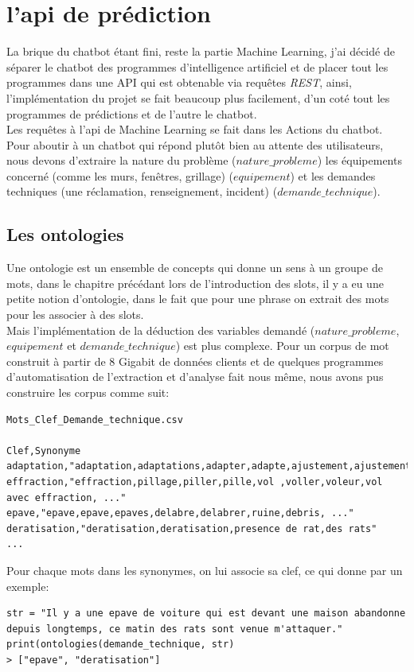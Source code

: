 \chapter{l'api de prédiction}
La brique du chatbot étant fini, reste la partie Machine Learning, j'ai décidé de séparer le chatbot des programmes d'intelligence artificiel et de placer tout les programmes dans une API qui est obtenable via requêtes \textit{REST}, ainsi, l'implémentation du projet se fait beaucoup plus facilement, d'un coté tout les programmes de prédictions et de l'autre le chatbot.\\
Les requêtes à l'api de Machine Learning se fait dans les Actions du chatbot.\\
\linebreak
Pour aboutir à un chatbot qui répond plutôt bien au attente des utilisateurs, nous devons d'extraire la nature du problème ($nature\_probleme$) les équipements concerné (comme les murs, fenêtres, grillage) ($equipement$) et les demandes techniques (une réclamation, renseignement, incident) ($demande\_technique$).

\pagebreak
\section{Les ontologies}
Une ontologie est un ensemble de concepts qui donne un sens à un groupe de mots, dans le chapitre précédant lors de l'introduction des slots, il y a eu une petite notion d'ontologie, dans le fait que pour une phrase on extrait des mots pour les associer à des slots.\\
Mais l'implémentation de la déduction des variables demandé ($nature\_probleme$, $equipement$ et $demande\_technique$) est plus complexe. Pour un corpus de mot construit à partir de 8 Gigabit de données clients et de quelques programmes d'automatisation de l'extraction et d'analyse fait nous même, nous avons pus construire les corpus comme suit:

\begin{lstlisting}
Mots_Clef_Demande_technique.csv

Clef,Synonyme
adaptation,"adaptation,adaptations,adapter,adapte,ajustement,ajustements,ajuster,..."
effraction,"effraction,pillage,piller,pille,vol ,voller,voleur,vol avec effraction, ..."
epave,"epave,epave,epaves,delabre,delabrer,ruine,debris, ..."
deratisation,"deratisation,deratisation,presence de rat,des rats"
...
\end{lstlisting}

Pour chaque mots dans les synonymes, on lui associe sa clef, ce qui donne par un exemple:
\begin{lstlisting}
str = "Il y a une epave de voiture qui est devant une maison abandonne depuis longtemps, ce matin des rats sont venue m'attaquer."
print(ontologies(demande_technique, str)
> ["epave", "deratisation"]
\end{lstlisting}

